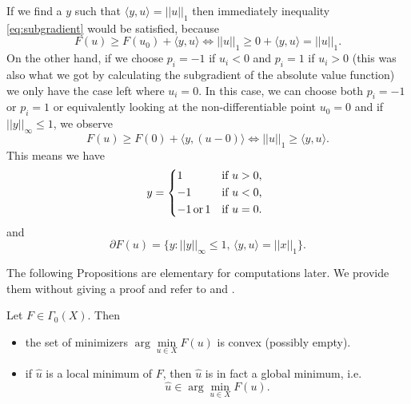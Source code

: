 \begin{example}
\begin{enumerate}
             If we find a $y$ such that $\langle y, u \rangle = ||u||_{1}$ then immediately inequality \ref{eq:subgradient} would be satisfied, because
                $$
                    F(u) \ge F(u_{0}) + \langle y, u \rangle \Longleftrightarrow ||u||_{1} \ge 0 + \langle y, u \rangle = ||u||_{1}.
                $$
            On the other hand, if we choose $p_{i} = -1$ if $u_{i} < 0$ and $p_{i} = 1$ if $u_{i} > 0$ (this was also what we got by calculating the subgradient of the absolute value function) we only have the case left where $u_{i} = 0$. In this case, we can choose both $p_{i} = -1$ or $p_{i} = 1$ or equivalently looking at the non-differentiable point $u_{0} = 0$ and if $||y||_{\infty} \le 1$, we observe
                $$
                    F(u) \ge F(0) + \langle y,  (u - 0) \rangle \Longleftrightarrow ||u||_{1} \ge \langle y, u \rangle.
                $$
            This means we have
                $$
                    y =
                        \begin{dcases*}
                            1 & \textnormal{if $u > 0$,} \\
                            -1 & \textnormal{if $u < 0$,} \\
                            -1 \,\textnormal{or}\, 1 & \textnormal{if $u = 0$.}
                        \end{dcases*}
                $$
            and
                \begin{equation}
                    \partial F(u) = \big\{ y : ||y||_{\infty} \le 1, \, \langle y, u \rangle = ||x||_{1} \big\}.
                    \label{eq:subdifferential_of_l1_norm}
                \end{equation}
        \end{enumerate}
    \end{example}

    The following Propositions are elementary for computations later. We provide them without giving a proof and refer to \cite{Rockafellar} and \cite{Chambolle-et-al-10}.

    \begin{proposition} %

        Let $F \in \Gamma_{0}(X)$. Then

        \begin{itemize}
            \item the set of minimizers $\arg \min\limits_{u \in X} F(u)$ is convex (possibly empty).
            \item if $\hat{u}$ is a local minimum of $F$, then $\hat{u}$ is in fact a global minimum, i.e.
                $$
                    \hat{u} \in \arg \min_{u \in X} F(u).
                $$
        \end{itemize}

    \end{proposition}

